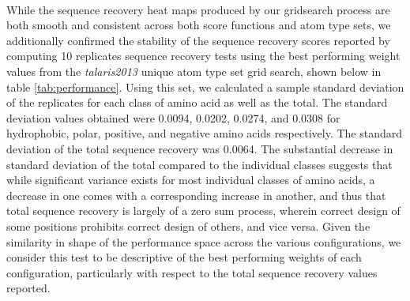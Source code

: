 \paragraph{}
While the sequence recovery heat maps produced by our gridsearch process are both smooth and consistent across both score functions and atom type sets, we additionally confirmed the stability of the sequence recovery scores reported by computing 10 replicates sequence recovery tests using the best performing weight values from the \textit{talaris2013} unique atom type set grid search, shown below in table \ref{tab:performance}.
Using this set, we calculated a sample standard deviation of the replicates for each class of amino acid as well as the total. 
The standard deviation values obtained were 0.0094, 0.0202, 0.0274, and 0.0308 for hydrophobic, polar, positive, and negative amino acids respectively.
The standard deviation of the total sequence recovery was 0.0064.
The substantial decrease in standard deviation of the total compared to the individual classes suggests that while significant variance exists for most individual classes of amino acids, a decrease in one comes with a corresponding increase in another, and thus that total sequence recovery is largely of a zero sum process, wherein correct design of some positions prohibits correct design of others, and vice versa.
Given the similarity in shape of the performance space across the various configurations, we consider this test to be descriptive of the best performing weights of each configuration, particularly with respect to the total sequence recovery values reported.

